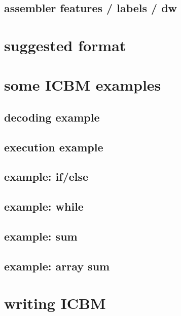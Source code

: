 

\subsection{assembler features / labels / dw}



\section{suggested format}


\section{some ICBM examples}

\subsection{decoding example}


\subsection{execution example}


\subsection{example: if/else}



\subsection{example: while}



\subsection{example: sum}



\subsection{example: array sum}



\section{writing ICBM}

